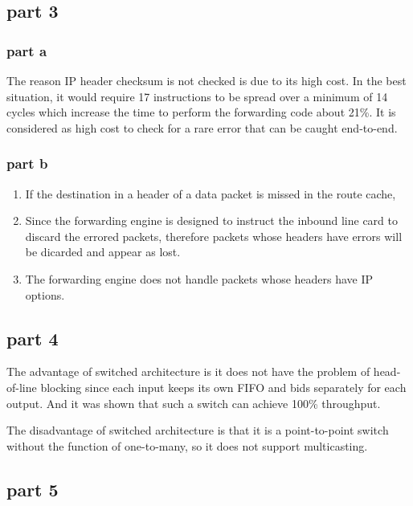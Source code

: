 \subsection{part 3}
\subsubsection{part a}
The reason IP header checksum is not checked is due to its high cost. In the best situation, it would require 17 instructions to be spread over a minimum of 14 cycles which increase the time to perform the forwarding code about 21\%. It is considered as high cost to check for a rare error that can be caught end-to-end.

\subsubsection{part b}
\begin{enumerate}
\item If the destination in a header of a data packet is missed in the route cache,
\item Since the forwarding engine is designed to instruct the inbound line card to discard the errored packets, therefore packets whose headers have errors will be dicarded and appear as lost.
\item The forwarding engine does not handle packets whose headers have IP options.
\
\end{enumerate}

\subsection{part 4}
The advantage of switched architecture is it does not have the problem of head-of-line blocking since each input keeps its own FIFO and bids separately for each output. And it was shown that such a switch can achieve 100\% throughput.

The disadvantage of switched architecture is that it is a point-to-point switch without the function of one-to-many, so it does not support multicasting.

\subsection{part 5}

